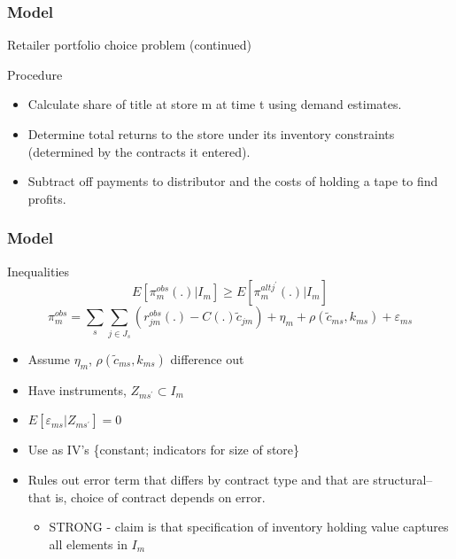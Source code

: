 \documentclass[notes=show]{beamer}
\begin{document}
\begin{frame}
\frametitle{Model}

Retailer portfolio choice problem (continued)

Procedure

\begin{itemize}
\item Calculate share of title at store m at time t using demand estimates.

\item Determine total returns to the store under its inventory constraints
(determined by the contracts it entered).

\item Subtract off payments to distributor and the costs of holding a tape
to find profits.
\end{itemize}
\end{frame}


\begin{frame}
\frametitle{Model}

Inequalities%
\[
E[\pi _{m}^{obs}(.)|I_{m}] \geq E[\pi _{m}^{altj^{\prime }}(.)|I_{m}] 
\]
\[
\pi _{m}^{obs} =\sum_{s}\sum_{j\in J_{s}}(r_{jm}^{obs}(.)-C(.)\widetilde{c}_{jm})+\eta _{m}+\rho (\widetilde{c}_{ms},k_{ms})+\varepsilon _{ms}
\]

\begin{itemize}
\item Assume $\eta _{m}$, $\rho (\widetilde{c}_{ms},k_{ms})$ difference out

\item Have instruments, $Z_{ms^{\prime }}\subset I_{m}$

\item $E[\varepsilon _{ms}|Z_{ms^{\prime }}]=0$

\item Use as IV's \{constant; indicators for size of store\}

\item Rules out error term that differs by contract type and that are
structural--that is, choice of contract depends on error.

\begin{itemize}
\item STRONG - claim is that specification of inventory holding value
captures all elements in $I_{m}$
\end{itemize}
\end{itemize}
\end{frame}

\end{document}
